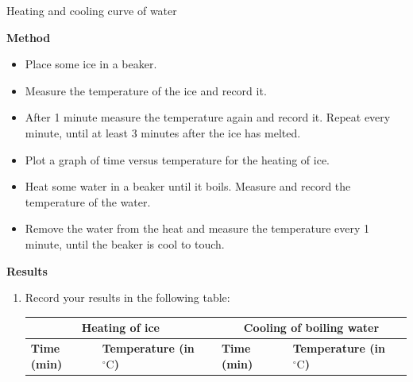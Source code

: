 \begin{f_experiment}{Heating and cooling curve of water}
{\label{m38736*eip-862}\noindent{}\textbf{Method}
\label{m38736*id9872}\begin{itemize}[noitemsep]
            \item Place some ice in a beaker.
\item Measure the temperature of the ice and record it.
\item After 1 minute measure the temperature again and record it. Repeat every minute, until at least 3 minutes after the ice has melted.
\item Plot a graph of time versus temperature for the heating of ice.
\item Heat some water in a beaker until it boils. Measure and record the temperature of the water.
\item Remove the water from the heat and measure the temperature every 1 minute, until the beaker is cool to touch.
\end{itemize}
\label{m38736*eip-282}
	\par 
      \label{m38736*eip-863}\noindent{}\textbf{Results} \\
\begin{enumerate}[noitemsep, label=\textbf{\arabic*}.]
\item Record your results in the following table: \\
          \begin{table}[H]
        \begin{center}
      \label{m38736*uid434}
    \noindent
      \begin{tabular}{|l|l|l|l|}\hline
\multicolumn{2}{|c|}{Heating of ice} & \multicolumn{2}{|c|}{Cooling of boiling water}  \\ \hline
 \textbf{Time (min)} & \textbf{Temperature (in $^{\circ} \text{C}$)} &  \textbf{Time (min)} & \textbf{Temperature (in $^{\circ} \text{C}$)} \\ \hline

\end{tabular}
\end{center}
\end{table}
\end{enumerate}}
\end{f_experiment}
